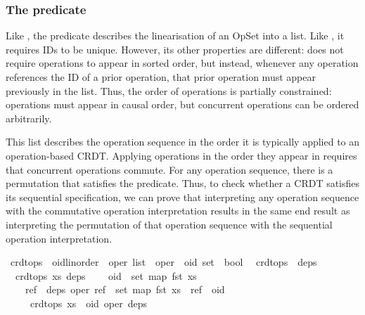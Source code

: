 \subsubsection{The  predicate}

Like , the  predicate describes the linearisation of an OpSet into a list.
Like , it requires IDs to be unique.
However, its other properties are different:  does not require operations to appear in sorted order, but instead, whenever any operation references the ID of a prior operation, that prior operation must appear previously in the  list.
Thus, the order of operations is partially constrained: operations must appear in causal order, but concurrent operations can be ordered arbitrarily.

This list describes the operation sequence in the order it is typically applied to an operation-based CRDT.
Applying operations in the order they appear in  requires that concurrent operations commute.
For any  operation sequence, there is a permutation that satisfies the  predicate.
Thus, to check whether a CRDT satisfies its sequential specification, we can prove that interpreting any  operation sequence with the commutative operation interpretation results in the same end result as interpreting the  permutation of that operation sequence with the sequential operation interpretation.

\begin{isabelle}
\isamarkupfalse%
\ crdt{\isacharunderscore}ops\ {\isacharcolon}{\isacharcolon}\ {\isachardoublequoteopen}{\isacharparenleft}{\isacharprime}oid{\isacharcolon}{\isacharcolon}{\isacharbraceleft}linorder{\isacharbraceright}\ {\isasymtimes}\ {\isacharprime}oper{\isacharparenright}\ list\ {\isasymRightarrow}\ {\isacharparenleft}{\isacharprime}oper\ {\isasymRightarrow}\ {\isacharprime}oid\ set{\isacharparenright}\ {\isasymRightarrow}\ bool{\isachardoublequoteclose}\isanewline
{}\isanewline
\ \ {\isachardoublequoteopen}crdt{\isacharunderscore}ops\ {\isacharbrackleft}{\isacharbrackright}\ deps{\isachardoublequoteclose}\ {\isacharbar}\isanewline
\ \ {\isachardoublequoteopen}{\isasymlbrakk}crdt{\isacharunderscore}ops\ xs\ deps{\isacharsemicolon}\isanewline
\ \ \ \ oid\ {\isasymnotin}\ set\ {\isacharparenleft}map\ fst\ xs{\isacharparenright}{\isacharsemicolon}\isanewline
\ \ \ \ {\isasymforall}ref\ {\isasymin}\ deps\ oper{\isachardot}\ ref\ {\isasymin}\ set\ {\isacharparenleft}map\ fst\ xs{\isacharparenright}\ {\isasymand}\ ref\ {\isacharless}\ oid\isanewline
\ \ \ {\isasymrbrakk}\ {\isasymLongrightarrow}\ crdt{\isacharunderscore}ops\ {\isacharparenleft}xs\ {\isacharat}\ {\isacharbrackleft}{\isacharparenleft}oid{\isacharcomma}\ oper{\isacharparenright}{\isacharbrackright}{\isacharparenright}\ deps{\isachardoublequoteclose}
\end{isabelle}


